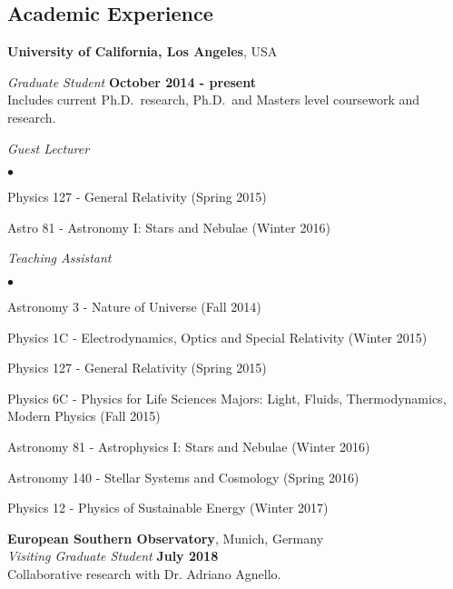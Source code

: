 \documentclass[margin,line]{res}
\newenvironment{list2}{
  \begin{list}{$\bullet$}{%
      \setlength{\itemsep}{0in}
      \setlength{\parsep}{0in} \setlength{\parskip}{0in}
      \setlength{\topsep}{0in} \setlength{\partopsep}{0in} 
      \setlength{\leftmargin}{0.2in}}}{\end{list}}
\begin{document}
\begin{resume}
\section{\sc Academic Experience}
{\bf University of California, Los Angeles}, USA

\vspace{-.3cm}
{\em Graduate Student} \hfill {\bf October 2014 - present}\\
Includes current Ph.D.~research, Ph.D.~and Masters level coursework and
research.


{\em Guest Lecturer} \hfill {\bf}\\
\begin{list2}
	\item Physics 127 - General Relativity (Spring 2015)
	\item Astro 81 - Astronomy I: Stars and Nebulae (Winter 2016)
\end{list2}
	
{\em Teaching Assistant} \hfill {}\\
\begin{list2}
	\item Astronomy 3 - Nature of Universe (Fall 2014)
	\item Physics 1C - Electrodynamics, Optics and Special Relativity (Winter 2015)
	\item Physics 127 - General Relativity (Spring 2015)
	\item Physics 6C - Physics for Life Sciences Majors: Light, Fluids, Thermodynamics, Modern Physics (Fall 2015)
	\item Astronomy 81 - Astrophysics I: Stars and Nebulae (Winter 2016)
	\item Astronomy 140 - Stellar Systems and Cosmology (Spring 2016)
	\item Physics 12 - Physics of Sustainable Energy (Winter 2017)
\end{list2}

{\bf European Southern Observatory}, Munich, Germany\\
{\em Visiting Graduate Student} \hfill {\bf July 2018}\\
Collaborative research with Dr. Adriano Agnello.




\end{resume}
\end{document}
